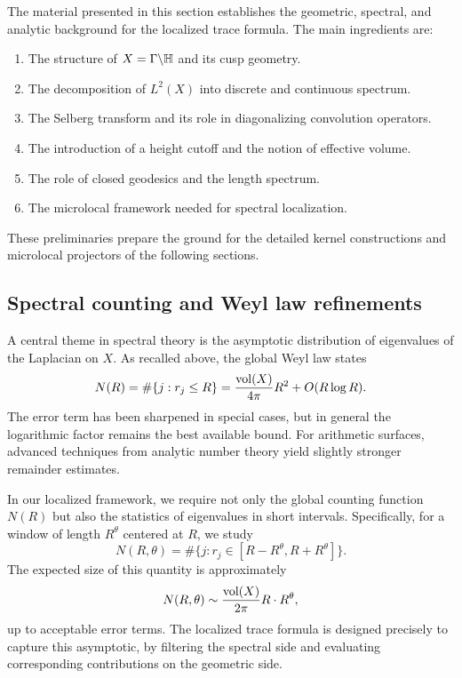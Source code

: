 The material presented in this section establishes the geometric, spectral, and analytic background for the localized trace formula. The main ingredients are:

\begin{enumerate}
  \item The structure of $X = \Gamma\backslash\mathbb{H}$ and its cusp geometry.
  \item The decomposition of $L^2(X)$ into discrete and continuous spectrum.
  \item The Selberg transform and its role in diagonalizing convolution operators.
  \item The introduction of a height cutoff and the notion of effective volume.
  \item The role of closed geodesics and the length spectrum.
  \item The microlocal framework needed for spectral localization.
\end{enumerate}

These preliminaries prepare the ground for the detailed kernel constructions and microlocal projectors of the following sections.


\subsection{Spectral counting and Weyl law refinements}\label{subsec:weyl}

A central theme in spectral theory is the asymptotic distribution of eigenvalues of the Laplacian on $X$. As recalled above, the global Weyl law states
\[
N(R) = \#\{ j : r_j \leq R\} = \frac{\operatorname{vol}(X)}{4\pi} R^2 + O(R \log R).
\]
The error term has been sharpened in special cases, but in general the logarithmic factor remains the best available bound. For arithmetic surfaces, advanced techniques from analytic number theory yield slightly stronger remainder estimates.

In our localized framework, we require not only the global counting function $N(R)$ but also the statistics of eigenvalues in short intervals. Specifically, for a window of length $R^\theta$ centered at $R$, we study
\[
N(R,\theta) = \#\{ j : r_j \in [R-R^\theta, R+R^\theta]\}.
\]
The expected size of this quantity is approximately
\[
N(R,\theta) \sim \frac{\operatorname{vol}(X)}{2\pi} R \cdot R^\theta,
\]
up to acceptable error terms. The localized trace formula is designed precisely to capture this asymptotic, by filtering the spectral side and evaluating corresponding contributions on the geometric side.

